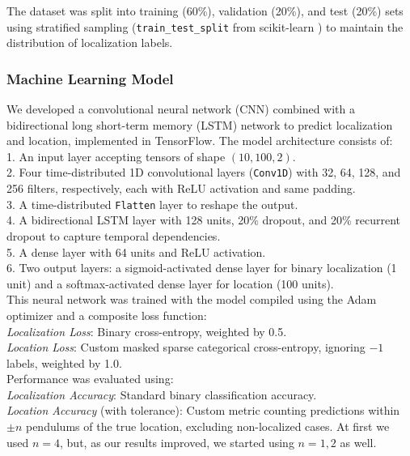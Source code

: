 \documentclass[11pt]{article}
\begin{document}
The dataset was split into training (60\%), validation (20\%), and test (20\%) sets using stratified sampling (\texttt{train\_test\_split} from scikit-learn \cite{scikit-learn}) to maintain the distribution of localization labels. 

\subsubsection*{Machine Learning Model}
We developed a convolutional neural network (CNN) combined with a bidirectional long short-term memory (LSTM) network to predict localization and location, implemented in TensorFlow. The model architecture consists of:\\
1. An input layer accepting tensors of shape $(10, 100, 2)$.\\
2. Four time-distributed 1D convolutional layers (\texttt{Conv1D}) with 32, 64, 128, and 256 filters, respectively, each with ReLU activation and same padding. \\
3. A time-distributed \texttt{Flatten} layer to reshape the output. \\
4. A bidirectional LSTM layer with 128 units, 20\% dropout, and 20\% recurrent dropout to capture temporal dependencies. \\
5. A dense layer with 64 units and ReLU activation. \\
6. Two output layers: a sigmoid-activated dense layer for binary localization (1 unit) and a softmax-activated dense layer for location (100 units). \\

This neural network was trained with the model compiled using the Adam optimizer and a composite loss function: \\
{\it Localization Loss}: Binary cross-entropy, weighted by 0.5. \\
{\it Location Loss}: Custom masked sparse categorical cross-entropy, ignoring $-1$ labels, weighted by 1.0. \\

Performance was evaluated using: \\
{\it Localization Accuracy}: Standard binary classification accuracy. \\
{\it Location Accuracy} (with tolerance): Custom metric counting predictions within $\pm n$ pendulums of the true location, excluding non-localized cases. At first we used $n=4$, but, as our results improved, we started using $n=1,2$ as well.\\
\end{document}
